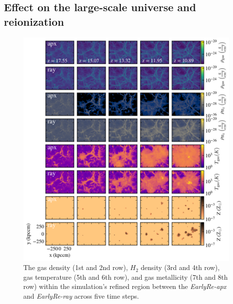 \documentclass[linenumbers, twocolumn]{aastex631}
\begin{document}
\subsection{Effect on the large-scale universe and reionization}

\begin{figure}
	\centering
	\includegraphics[width=\textwidth]{EarlyRe/gas_surface_density_multiple_ver1088_ver2.png}
	\caption{The gas density (1st and 2nd row), $H_{2}$ density (3rd and 4th row), gas temperature (5th and 6th row), and gas metallicity (7th and 8th row) within the simulation's refined region between the \textit{EarlyRe-apx} and \textit{EarlyRe-ray} across five time steps.}
	\label{fig:gas_surface_density_wholebox}
\end{figure}
\end{document}
